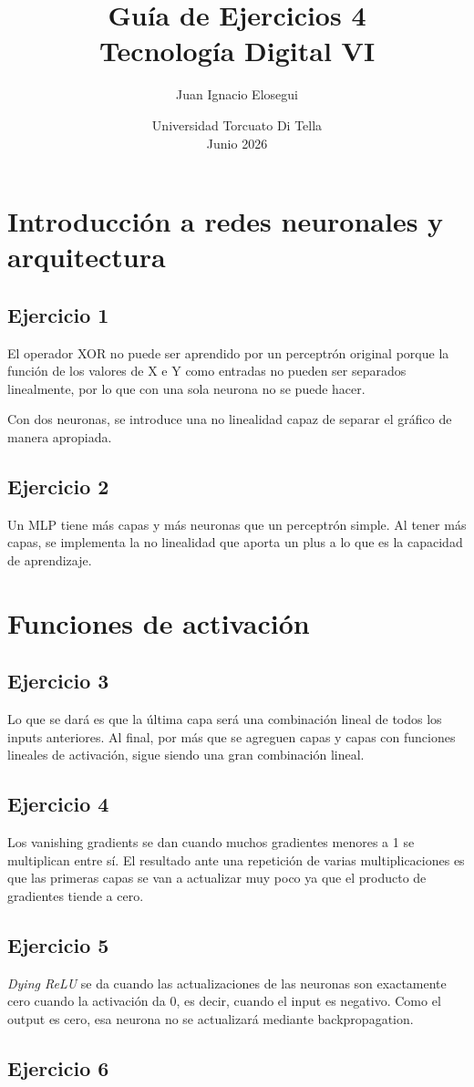\documentclass[a4paper,12pt]{article}
\title{\vspace{-2cm}\textbf{Guía de Ejercicios 4}\\[0.2cm]
\large Tecnología Digital VI}
\author{Juan Ignacio Elosegui}
\date{Universidad Torcuato Di Tella \\ Junio 2026}
\begin{document}
\maketitle

\section*{Introducción a redes neuronales y arquitectura}
\subsection*{Ejercicio 1}
\noindent El operador XOR no puede ser aprendido por un perceptrón original porque la función de los valores de X e Y como entradas no pueden ser separados linealmente, por lo que con una sola neurona no se puede hacer.

Con dos neuronas, se introduce una no linealidad capaz de separar el gráfico de manera apropiada.
\subsection*{Ejercicio 2}
\noindent Un MLP tiene más capas y más neuronas que un perceptrón simple. Al tener más capas, se implementa la no linealidad que aporta un plus a lo que es la capacidad de aprendizaje.

\section*{Funciones de activación}
\subsection*{Ejercicio 3}
\noindent Lo que se dará es que la última capa será una combinación lineal de todos los inputs anteriores. Al final, por más que se agreguen capas y capas con funciones lineales de activación, sigue siendo una gran combinación lineal.
\subsection*{Ejercicio 4}
\noindent Los vanishing gradients se dan cuando muchos gradientes menores a 1 se multiplican entre sí. El resultado ante una repetición de varias multiplicaciones es que las primeras capas se van a actualizar muy poco ya que el producto de gradientes tiende a cero.
\subsection*{Ejercicio 5}
\noindent \textit{Dying ReLU} se da cuando las actualizaciones de las neuronas son exactamente cero cuando la activación da 0, es decir, cuando el input es negativo. Como el output es cero, esa neurona no se actualizará mediante backpropagation.
\subsection*{Ejercicio 6}
\noindent
\end{document}
